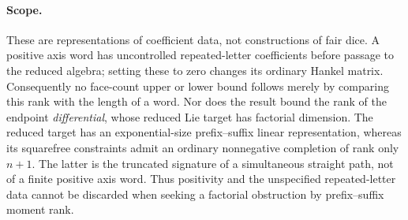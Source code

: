 \documentclass[11pt]{article}
\begin{document}
\paragraph{Scope.}
These are representations of coefficient data, not constructions
of fair dice. A positive axis word has uncontrolled repeated-letter
coefficients before passage to the reduced algebra; setting these to
zero changes its ordinary Hankel matrix. Consequently no face-count
upper or lower bound follows merely by comparing this rank with the
length of a word. Nor does the result bound the rank of the endpoint
\emph{differential}, whose reduced Lie target has factorial dimension.
The reduced target has an exponential-size prefix--suffix linear
representation, whereas its squarefree constraints admit an ordinary
nonnegative completion of rank only $n+1$. The latter is the truncated
signature of a simultaneous straight path, not of a finite positive
axis word. Thus positivity and the unspecified repeated-letter data
cannot be discarded when seeking a factorial obstruction by
prefix--suffix moment rank.
\end{document}
